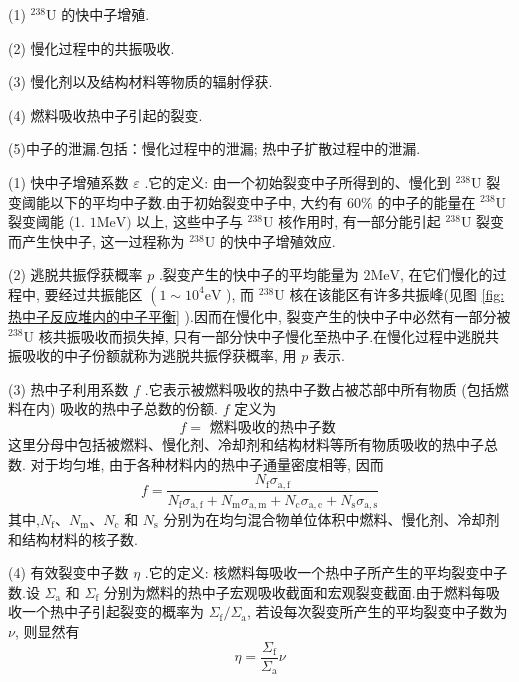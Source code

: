 \documentclass{Sichuan Normal University}
\begin{document}
(1) ${ }^{238} \mathrm{U}$ 的快中子增殖.

(2) 慢化过程中的共振吸收.

(3) 慢化剂以及结构材料等物质的辐射俘获.

(4) 燃料吸收热中子引起的裂变.

(5)中子的泄漏.包括：慢化过程中的泄漏; 热中子扩散过程中的泄漏.

(1) 快中子增殖系数 $\varepsilon$ .它的定义: 由一个初始裂变中子所得到的、慢化到 ${ }^{238} \mathrm{U}$ 裂变阈能以下的平均中子数.由于初始裂变中子中, 大约有 $60 \%$ 的中子的能量在 ${ }^{238} \mathrm{U}$ 裂变阈能 (1. $1 \mathrm{MeV})$ 以上, 这些中子与 ${ }^{238} \mathrm{U}$ 核作用时, 有一部分能引起 ${ }^{238} \mathrm{U}$ 裂变而产生快中子, 这一过程称为 ${ }^{238} \mathrm{U}$ 的快中子增殖效应.

(2) 逃脱共振俘获概率 $p$ .裂变产生的快中子的平均能量为 $2 \mathrm{MeV}$, 在它们慢化的过程中, 要经过共振能区 $\left(1 \sim 10^4 \mathrm{eV}\right.$ ), 而 ${ }^{238} \mathrm{U}$ 核在该能区有许多共振峰(见图 \ref{fig:热中子反应堆内的中子平衡} ).因而在慢化中, 裂变产生的快中子中必然有一部分被 ${ }^{238} \mathrm{U}$ 核共振吸收而损失掉, 只有一部分快中子慢化至热中子.在慢化过程中逃脱共振吸收的中子份额就称为逃脱共振俘获概率, 用 $p$ 表示.

(3) 热中子利用系数 $f$ .它表示被燃料吸收的热中子数占被芯部中所有物质 (包括燃料在内) 吸收的热中子总数的份额. $f$ 定义为
\begin{equation}
    f=\text { 燃料吸收的热中子数 }
\end{equation}
这里分母中包括被燃料、慢化剂、冷却剂和结构材料等所有物质吸收的热中子总数.
对于均匀堆, 由于各种材料内的热中子通量密度相等, 因而
\begin{equation}
    f=\frac{N_{\mathrm{f}} \sigma_{\mathrm{a}, \mathrm{f}}}{N_{\mathrm{f}} \sigma_{\mathrm{a}, \mathrm{f}}+N_{\mathrm{m}} \sigma_{\mathrm{a}, \mathrm{m}}+N_{\mathrm{c}} \sigma_{\mathrm{a}, \mathrm{c}}+N_{\mathrm{s}} \sigma_{\mathrm{a}, \mathrm{s}}}
\end{equation}
其中,$N_{\mathrm{f}} 、 N_{\mathrm{m}} 、 N_{\mathrm{c}}$ 和 $N_{\mathrm{s}}$ 分别为在均匀混合物单位体积中燃料、慢化剂、冷却剂和结构材料的核子数.

(4) 有效裂变中子数 $\eta$ .它的定义: 核燃料每吸收一个热中子所产生的平均裂变中子数.设 $\Sigma_{\mathrm{a}}$ 和 $\Sigma_{\mathrm{f}}$ 分别为燃料的热中子宏观吸收截面和宏观裂变截面.由于燃料每吸收一个热中子引起裂变的概率为 $\Sigma_{\mathrm{f}} / \Sigma_{\mathrm{a}}$, 若设每次裂变所产生的平均裂变中子数为 $\nu$, 则显然有
\begin{equation}
\eta=\frac{\Sigma_{\mathrm{f}}}{\Sigma_{\mathrm{a}}} \nu
\end{equation}
\end{document}
